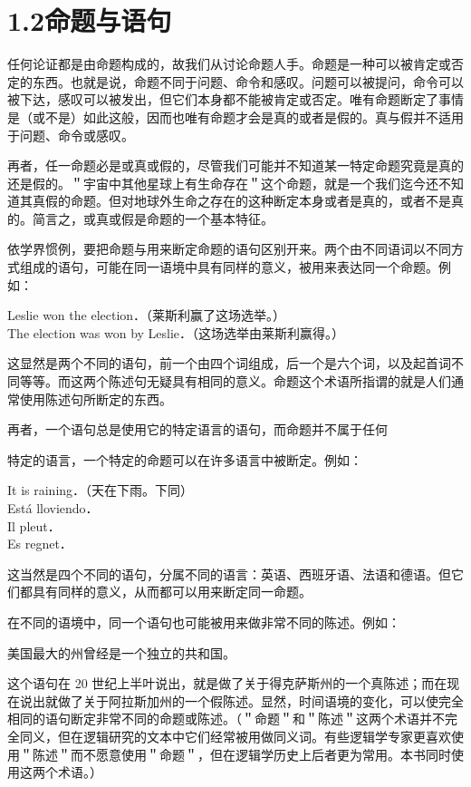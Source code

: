 \section*{1.2命题与语句}
任何论证都是由命题构成的，故我们从讨论命题人手。命题是一种可以被肯定或否定的东西。也就是说，命题不同于问题、命令和感叹。问题可以被提问，命令可以被下达，感叹可以被发出，但它们本身都不能被肯定或否定。唯有命题断定了事情是（或不是）如此这般，因而也唯有命题才会是真的或者是假的。真与假并不适用于问题、命令或感叹。

再者，任一命题必是或真或假的，尽管我们可能并不知道某一特定命题究竟是真的还是假的。＂宇宙中其他星球上有生命存在＂这个命题，就是一个我们迄今还不知道其真假的命题。但对地球外生命之存在的这种断定本身或者是真的，或者不是真的。简言之，或真或假是命题的一个基本特征。

依学界惯例，要把命题与用来断定命题的语句区别开来。两个由不同语词以不同方式组成的语句，可能在同一语境中具有同样的意义，被用来表达同一个命题。例如：

Leslie won the election．（莱斯利赢了这场选举。）\\
The election was won by Leslie．（这场选举由莱斯利赢得。）

这显然是两个不同的语句，前一个由四个词组成，后一个是六个词，以及起首词不同等等。而这两个陈述句无疑具有相同的意义。命题这个术语所指谓的就是人们通常使用陈述句所断定的东西。

再者，一个语句总是使用它的特定语言的语句，而命题并不属于任何

特定的语言，一个特定的命题可以在许多语言中被断定。例如：

It is raining．（天在下雨。下同）\\
Está lloviendo．\\
Il pleut．\\
Es regnet．

这当然是四个不同的语句，分属不同的语言：英语、西班牙语、法语和德语。但它们都具有同样的意义，从而都可以用来断定同一命题。

在不同的语境中，同一个语句也可能被用来做非常不同的陈述。例如：

美国最大的州曾经是一个独立的共和国。

这个语句在 20 世纪上半叶说出，就是做了关于得克萨斯州的一个真陈述；而在现在说出就做了关于阿拉斯加州的一个假陈述。显然，时间语境的变化，可以使完全相同的语句断定非常不同的命题或陈述。（＂命题＂和＂陈述＂这两个术语并不完全同义，但在逻辑研究的文本中它们经常被用做同义词。有些逻辑学专家更喜欢使用＂陈述＂而不愿意使用＂命题＂，但在逻辑学历史上后者更为常用。本书同时使用这两个术语。）

